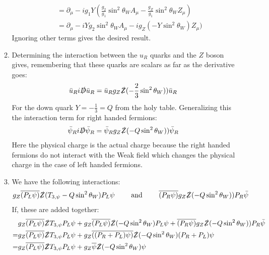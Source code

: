 \documentclass[12pt,a4]{article}
\begin{document}
\begin{enumerate}
\begin{enumerate}
\begin{align*}
                &= \partial_\mu - i g_1 Y \left(\frac{g_2}{g_1}\sin^2 \theta_W A_\mu - \frac{g_Z}{g_1} \sin^2\theta_W Z_\mu\right)\\
                &= \partial_\mu - i Y g_2\sin^2 \theta_W A_\mu - i g_Z(-Y \sin^2\theta_W) Z_\mu)
        \end{align*}
        Ignoring other terms gives the desired result.
      \item
        Determining the interaction between the $u_R$ quarks and the $Z$ boson gives, remembering that these quarks are scalars as far as the derivative goes:
        \begin{align*}
          \bar{u}_R i\slashed{D}  \bar{u}_R
                &= \bar{u}_R  g_Z \slashed{Z} (-\frac{2}{3} \sin^2\theta_W) ) \bar{u}_R
        \end{align*}
        For the down quark $Y = -\frac{1}{3} = Q$ from the holy table.
        Generalizing this the interaction term for right handed fermions:
        \begin{align*}
          \bar{\psi}_R i\slashed{D}  \bar{\psi}_R
                &= \bar{\psi}_R  g_Z \slashed{Z} (-Q \sin^2\theta_W) ) \bar{\psi}_R
        \end{align*}
        Here the physical charge is the actual charge because the right handed fermions do not interact with the Weak field which changes the physical charge in the case of left handed fermions.
      \item
        We have the following interactions:
        \begin{align*}
          g_Z \overline{\left(P_L \psi\right)} \slashed{Z}  (T_{3, \psi} - Q \sin^2 \theta_W)P_L\psi \qquad \text{ and } \qquad \overline{\left(P_R \psi\right)}  g_Z \slashed{Z} (-Q \sin^2\theta_W) ) P_R\bar{\psi} 
        \end{align*}
        If, these are added together:
        \begin{align*}
                          & g_Z \overline{\left(P_L \psi\right)} \slashed{Z}  T_{3, \psi} P_L\psi + g_Z \overline{\left(P_L \psi\right)} \slashed{Z}( - Q \sin^2 \theta_W )P_L\psi + \overline{\left(P_R \psi\right)}  g_Z \slashed{Z} (-Q \sin^2\theta_W) ) P_R\bar{\psi}\\
          =               & g_Z \overline{\left(P_L \psi\right)} \slashed{Z}  T_{3, \psi} P_L\psi + g_Z \overline{\left((P_R + P_L) \psi\right)} \slashed{Z}( - Q \sin^2 \theta_W )(P_R + P_L)\psi \\
          =               & g_Z \overline{\left(P_L \psi\right)} \slashed{Z}  T_{3, \psi} P_L\psi + g_Z \overline{\psi} \slashed{Z}( - Q \sin^2 \theta_W ) \psi 

\end{align*}
\end{enumerate}
\end{enumerate}
\end{document}
